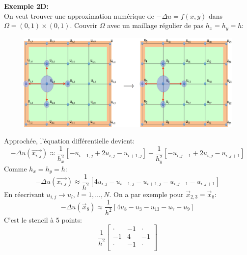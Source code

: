 \textbf{Exemple 2D:}\\
On veut trouver une approximation numérique de $-\Delta u=f(x,y)$ dans $\Omega=(0,1)\times(0,1)$.
Couvrir $\Omega$ avec un maillage régulier de pas $h_x=h_y=h$:
\begin{figure}[H]
    \centering
    \includegraphics[width=\linewidth]{images/semaine9_diff_finies_2d.png}
\end{figure}
Approchée, l'équation différentielle devient:
\begin{equation*}
    -\Delta u(\overrightarrow{x_{i,j}})\approx\frac{1}{h_x^2}[-u_{i-1,j}+2u_{i,j}-u_{i+1,j}]+\frac{1}{h_y^2}[-u_{i,j-1}+2u_{i,j}-u_{i,j+1}]
\end{equation*}
Comme $h_x=h_y=h$:
\begin{equation*}
    -\Delta u(\overrightarrow{x_{i,j}})\approx\frac{1}{h^2}[4u_{i,j}-u_{i-1,j}-u_{i+1,j}-u_{i,j-1}-u_{i,j+1}]
\end{equation*}
En réecrivant $u_{i,j}\rightarrow u_l$, $l=1,\dots,N$. On a par exemple pour
$\overrightarrow{x}_{2,3}=\overrightarrow{x}_8$:
\begin{equation*}
    -\Delta u(\overrightarrow{x}_8)\approx\frac{1}{h^2}[4u_8-u_3-u_13-u_7-u_9]
\end{equation*}
C'est le stencil à 5 points:
\begin{equation*}
    \frac{1}{h^2}
    \begin{bmatrix}
        \cdot & -1 & \cdot \\
        -1    & 4  & -1    \\
        \cdot & -1 & \cdot \\
    \end{bmatrix}
\end{equation*}



